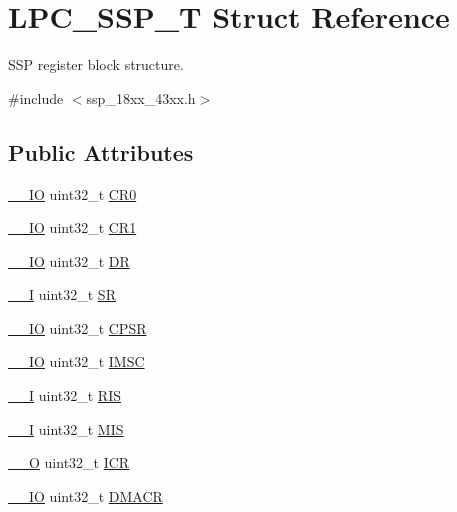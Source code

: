 \hypertarget{struct_l_p_c___s_s_p___t}{}\section{L\+P\+C\+\_\+\+S\+S\+P\+\_\+T Struct Reference}
\label{struct_l_p_c___s_s_p___t}


S\+SP register block structure.  




{\ttfamily \#include $<$ssp\+\_\+18xx\+\_\+43xx.\+h$>$}

\subsection*{Public Attributes}
\begin{DoxyCompactItemize}
\item 
\hyperlink{core__sc300_8h_aec43007d9998a0a0e01faede4133d6be}{\+\_\+\+\_\+\+IO} uint32\+\_\+t \hyperlink{struct_l_p_c___s_s_p___t_af8ad155254cb659608f4c1c6bd83b62b}{C\+R0}
\item 
\hyperlink{core__sc300_8h_aec43007d9998a0a0e01faede4133d6be}{\+\_\+\+\_\+\+IO} uint32\+\_\+t \hyperlink{struct_l_p_c___s_s_p___t_a648b740833659e86e8be3a8f6c17147c}{C\+R1}
\item 
\hyperlink{core__sc300_8h_aec43007d9998a0a0e01faede4133d6be}{\+\_\+\+\_\+\+IO} uint32\+\_\+t \hyperlink{struct_l_p_c___s_s_p___t_a7a32964f3ca72981b80cf4012c515ea8}{DR}
\item 
\hyperlink{core__sc300_8h_af63697ed9952cc71e1225efe205f6cd3}{\+\_\+\+\_\+I} uint32\+\_\+t \hyperlink{struct_l_p_c___s_s_p___t_a5f6421682b9a321abc8d4c91a6dbd964}{SR}
\item 
\hyperlink{core__sc300_8h_aec43007d9998a0a0e01faede4133d6be}{\+\_\+\+\_\+\+IO} uint32\+\_\+t \hyperlink{struct_l_p_c___s_s_p___t_a48e7161fc6e6b91bd724a17df5435141}{C\+P\+SR}
\item 
\hyperlink{core__sc300_8h_aec43007d9998a0a0e01faede4133d6be}{\+\_\+\+\_\+\+IO} uint32\+\_\+t \hyperlink{struct_l_p_c___s_s_p___t_a5969572eaab7a02f4bbd7c898f93ca73}{I\+M\+SC}
\item 
\hyperlink{core__sc300_8h_af63697ed9952cc71e1225efe205f6cd3}{\+\_\+\+\_\+I} uint32\+\_\+t \hyperlink{struct_l_p_c___s_s_p___t_a0aa742f8d7d4b2e2a6038b01dbc1aa5b}{R\+IS}
\item 
\hyperlink{core__sc300_8h_af63697ed9952cc71e1225efe205f6cd3}{\+\_\+\+\_\+I} uint32\+\_\+t \hyperlink{struct_l_p_c___s_s_p___t_aa4b72809de09f83335e72d0d0844a90b}{M\+IS}
\item 
\hyperlink{core__sc300_8h_a7e25d9380f9ef903923964322e71f2f6}{\+\_\+\+\_\+O} uint32\+\_\+t \hyperlink{struct_l_p_c___s_s_p___t_ad788fb9f7178c7a79588b429f74b9946}{I\+CR}
\item 
\hyperlink{core__sc300_8h_aec43007d9998a0a0e01faede4133d6be}{\+\_\+\+\_\+\+IO} uint32\+\_\+t \hyperlink{struct_l_p_c___s_s_p___t_a6a74b0cbac37f424e198ccef9a208d65}{D\+M\+A\+CR}
\end{DoxyCompactItemize}


